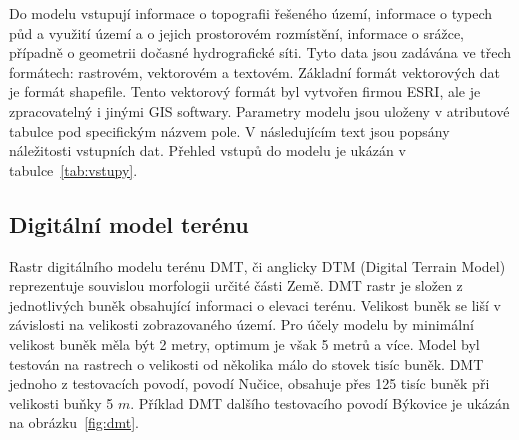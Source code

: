 


Do modelu vstupují informace o topografii řešeného území, informace o typech půd a využití území a o jejich prostorovém rozmístění, informace o srážce, případně o geometrii dočasné hydrografické síti.
Tyto data jsou zadávána ve třech formátech: rastrovém, vektorovém a textovém. 
Základní formát vektorových dat je formát shapefile. Tento vektorový formát byl vytvořen firmou ESRI, ale je zpracovatelný i jinými GIS softwary. Parametry modelu jsou uloženy v atributové tabulce pod specifickým názvem pole. 
V následujícím text jsou popsány náležitosti vstupních dat. 
% 
Přehled vstupů do modelu je ukázán v tabulce~\ref{tab:vstupy}.


% 

% 
% 
% 
% 
% 
% 
% 









\subsection{Digitální model terénu} \label{sec:vstupdmt} 

Rastr digitálního modelu terénu DMT, či anglicky DTM (Digital Terrain Model) reprezentuje souvislou morfologii určité části Země. DMT rastr je složen z jednotlivých buněk obsahující informaci o elevaci terénu.  Velikost buněk se liší v závislosti na velikosti zobrazovaného území. Pro účely modelu \smod by minimální velikost buněk měla být 2 metry, optimum je však 5 metrů a více. Model byl testován na rastrech o velikosti od několika málo do stovek tisíc buněk. DMT jednoho z testovacích povodí, povodí Nučice, obsahuje přes 125 tisíc buněk při velikosti buňky 5 $m$. Příklad DMT dalšího testovacího povodí Býkovice je ukázán na obrázku~\ref{fig:dmt}.


